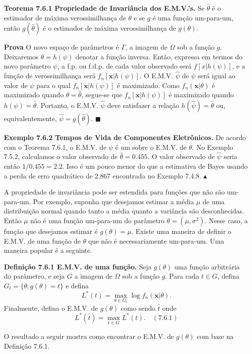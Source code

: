 \textbf{Teorema 7.6.1 Propriedade de Invariância dos E.M.V.'s.} Se $\hat{\theta}$ é o estimador de máxima verossimilhança de $\theta$ e se $g$ é uma função um-para-um, então $g(\hat{\theta})$ é o estimador de máxima verossimilhança de $g(\theta)$.

\textbf{Prova} O novo espaço de parâmetros é $\Gamma$, a imagem de $\Omega$ sob a função $g$. Deixaremos $\theta = h(\psi)$ denotar a função inversa. Então, expressa em termos do novo parâmetro $\psi$, a f.p. ou f.d.p. de cada valor observado será $f[x|h(\psi)]$, e a função de verossimilhança será $f_n[\mathbf{x}|h(\psi)]$. O E.M.V. $\hat{\psi}$ de $\psi$ será igual ao valor de $\psi$ para o qual $f_n[\mathbf{x}|h(\psi)]$ é maximizado. Como $f_n(\mathbf{x}|\theta)$ é maximizado quando $\theta = \hat{\theta}$, segue-se que $f_n[\mathbf{x}|h(\psi)]$ é maximizado quando $h(\psi) = \hat{\theta}$. Portanto, o E.M.V. $\hat{\psi}$ deve satisfazer a relação $h(\hat{\psi}) = \hat{\theta}$ ou, equivalentemente, $\hat{\psi} = g(\hat{\theta})$. $\blacksquare$

\textbf{Exemplo 7.6.2 Tempos de Vida de Componentes Eletrônicos.} De acordo com o Teorema 7.6.1, o E.M.V. de $\psi$ é um sobre o E.M.V. de $\theta$. No Exemplo 7.5.2, calculamos o valor observado de $\hat{\theta} = 0.455$. O valor observado de $\hat{\psi}$ seria então $1/0.455 = 2.2$. Isso é um pouco menor do que a estimativa de Bayes usando a perda de erro quadrático de 2.867 encontrada no Exemplo 7.4.8. $\blacktriangle$

A propriedade de invariância pode ser estendida para funções que não são um-para-um. Por exemplo, suponha que desejamos estimar a média $\mu$ de uma distribuição normal quando tanto a média quanto a variância são desconhecidas. Então $\mu$ não é uma função um-para-um do parâmetro $\theta = (\mu, \sigma^2)$. Nesse caso, a função que desejamos estimar é $g(\theta) = \mu$. Existe uma maneira de definir o E.M.V. de uma função de $\theta$ que não é necessariamente um-para-um. Uma maneira popular é a seguinte.

\textbf{Definição 7.6.1 E.M.V. de uma função.} Seja $g(\theta)$ uma função arbitrária do parâmetro, e seja $G$ a imagem de $\Omega$ sob a função $g$. Para cada $t \in G$, defina $G_t = \{\theta : g(\theta) = t\}$ e defina
$$ L^*(t) = \max_{\theta \in G_t} \log f_n(\mathbf{x}|\theta). $$
Finalmente, defina o E.M.V. de $g(\theta)$ como sendo $\hat{t}$ onde
$$ L^*(\hat{t}) = \max_{t \in G} L^*(t). \quad (7.6.1) $$

O resultado a seguir mostra como encontrar o E.M.V. de $g(\theta)$ com base na Definição 7.6.1.

